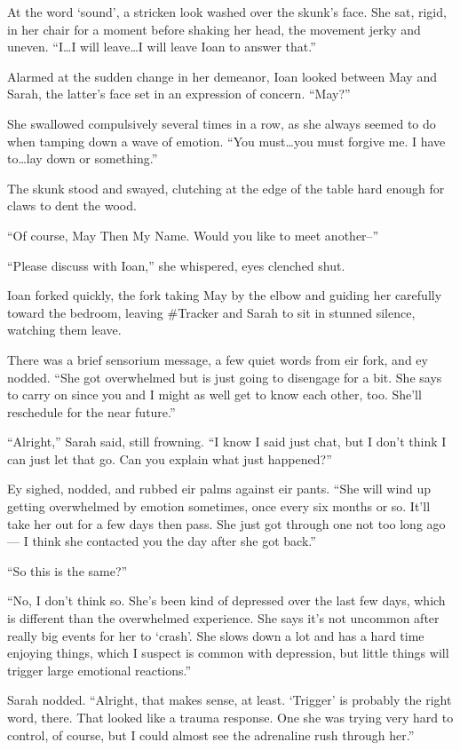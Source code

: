 At the word `sound', a stricken look washed over the skunk's face. She sat, rigid, in her chair for a moment before shaking her head, the movement jerky and uneven. ``I\ldots I will leave\ldots I will leave Ioan to answer that.''

Alarmed at the sudden change in her demeanor, Ioan looked between May and Sarah, the latter's face set in an expression of concern. ``May?''

She swallowed compulsively several times in a row, as she always seemed to do when tamping down a wave of emotion. ``You must\ldots you must forgive me. I have to\ldots lay down or something.''

The skunk stood and swayed, clutching at the edge of the table hard enough for claws to dent the wood.

``Of course, May Then My Name. Would you like to meet another--''

``Please discuss with Ioan,'' she whispered, eyes clenched shut.

Ioan forked quickly, the fork taking May by the elbow and guiding her carefully toward the bedroom, leaving \#Tracker and Sarah to sit in stunned silence, watching them leave.

There was a brief sensorium message, a few quiet words from eir fork, and ey nodded. ``She got overwhelmed but is just going to disengage for a bit. She says to carry on since you and I might as well get to know each other, too. She'll reschedule for the near future.''

``Alright,'' Sarah said, still frowning. ``I know I said just chat, but I don't think I can just let that go. Can you explain what just happened?''

Ey sighed, nodded, and rubbed eir palms against eir pants. ``She will wind up getting overwhelmed by emotion sometimes, once every six months or so. It'll take her out for a few days then pass. She just got through one not too long ago — I think she contacted you the day after she got back.''

``So this is the same?''

``No, I don't think so. She's been kind of depressed over the last few days, which is different than the overwhelmed experience. She says it's not uncommon after really big events for her to `crash'. She slows down a lot and has a hard time enjoying things, which I suspect is common with depression, but little things will trigger large emotional reactions.''

Sarah nodded. ``Alright, that makes sense, at least. `Trigger' is probably the right word, there. That looked like a trauma response. One she was trying very hard to control, of course, but I could almost see the adrenaline rush through her.''

